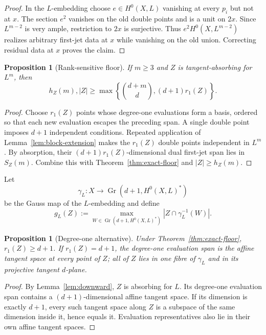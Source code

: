 \documentclass[11pt]{article}
\newtheorem{proposition}[theorem]{Proposition}
\newcommand{\Gr}{\operatorname{Gr}}
\begin{document}
\begin{proof}
In the $L$-embedding choose $e\in H^0(X,L)$ vanishing at every $p_i$ but not
at $x$.  The section $e^2$ vanishes on the old double points and is a unit on
$2x$.  Since $L^{m-2}$ is very ample, restriction to $2x$ is surjective.
Thus $e^2H^0(X,L^{m-2})$ realizes arbitrary first-jet data at $x$ while
vanishing on the old union.  Correcting residual data at $x$ proves the claim.
\end{proof}

\begin{proposition}[Rank-sensitive floor]\label{prop:rank-sensitive}
If $m\geq3$ and $Z$ is tangent-absorbing for $L^m$, then
\[
 h_Z(m),|Z|\geq
 \max\left\{\binom{d+m}{d},(d+1)r_1(Z)\right\}.
\]
\end{proposition}

\begin{proof}
Choose $r_1(Z)$ points whose degree-one evaluations form a basis, ordered so
that each new evaluation escapes the preceding span.  A single double point
imposes $d+1$ independent conditions.  Repeated application of
Lemma~\ref{lem:block-extension} makes the $r_1(Z)$ double points independent
in $L^m$.  By absorption, their $(d+1)r_1(Z)$-dimensional dual first-jet span
lies in $S_Z(m)$.  Combine this with Theorem~\ref{thm:exact-floor} and
$|Z|\geq h_Z(m)$.
\end{proof}

Let
\[
 \gamma_L:X\longrightarrow\Gr(d+1,H^0(X,L)^*)
\]
be the Gauss map of the $L$-embedding and define
\[
 g_L(Z):=\max_{W\in\Gr(d+1,H^0(X,L)^*)}
 |Z\cap\gamma_L^{-1}(W)|.
\]

\begin{proposition}[Degree-one alternative]\label{prop:degree-one}
Under Theorem~\ref{thm:exact-floor}, $r_1(Z)\geq d+1$.  If
$r_1(Z)=d+1$, the degree-one evaluation span is the affine tangent space at
every point of $Z$; all of $Z$ lies in one fibre of $\gamma_L$ and in its
projective tangent $d$-plane.
\end{proposition}

\begin{proof}
By Lemma~\ref{lem:downward}, $Z$ is absorbing for $L$.  Its degree-one
evaluation span contains a $(d+1)$-dimensional affine tangent space.  If its
dimension is exactly $d+1$, every such tangent space along $Z$ is a subspace
of the same dimension inside it, hence equals it.  Evaluation representatives
also lie in their own affine tangent spaces.
\end{proof}
\end{document}
